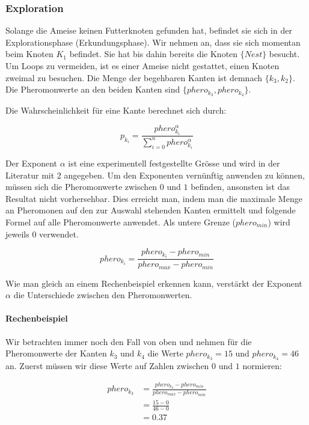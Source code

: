 \subsubsection*{Exploration}

Solange die Ameise keinen Futterknoten gefunden hat, befindet sie sich in der Explorationsphase (Erkundungsphase). Wir nehmen an, dass sie sich momentan beim Knoten $K_1$ befindet. Sie hat bis dahin bereits die Knoten $\{Nest\}$ besucht. Um Loops zu vermeiden, ist es einer Ameise nicht gestattet, einen Knoten zweimal zu besuchen. Die Menge der begehbaren Kanten ist demnach $\{k_3, k_2\}$. Die Pheromonwerte an den beiden Kanten sind $\{phero_{k_3}, phero_{k_4}\}$. 

Die Wahrscheinlichkeit für eine Kante berechnet sich durch:

\[ p_{k_i} = \frac{phero_{k_i}^\alpha}{\sum\nolimits_{i=0}^n phero_{k_i}^\alpha} \]

Der Exponent $\alpha$ ist eine experimentell festgestellte Grösse und wird in der Literatur mit $2$ angegeben. Um den Exponenten vernünftig anwenden zu können, müssen sich die Pheromonwerte zwischen $0$ und $1$ befinden, ansonsten ist das Resultat nicht vorhersehbar. Dies erreicht man, indem man die maximale Menge an Pheromonen auf den zur Auswahl stehenden Kanten ermittelt und folgende Formel auf alle Pheromonwerte anwendet. Als untere Grenze ($phero_{min}$) wird jeweils $0$ verwendet.

\[ phero_{k_i} = \frac{phero_{k_i} - phero_{min}}{phero_{max} - phero_{min}} \] 

Wie man gleich an einem Rechenbeispiel erkennen kann, verstärkt der Exponent $\alpha$ die Unterschiede zwischen den Pheromonwerten. 

\paragraph*{Rechenbeispiel}

Wir betrachten immer noch den Fall von oben und nehmen für die Pheromonwerte der Kanten $k_3$ und $k_4$ die Werte $phero_{k_3} = 15 $ und $phero_{k_4} = 46$ an. Zuerst müssen wir diese Werte auf Zahlen zwischen $0$ und $1$ normieren:

\begin{equation*}
\begin{split}
phero_{k_3} & = \frac{phero_{k_3} - phero_{min}}{phero_{max} - phero_{min}} \\
            & = \frac{15 - 0}{46 - 0} \\
            & = 0.37
\end{split}
\end{equation*}

